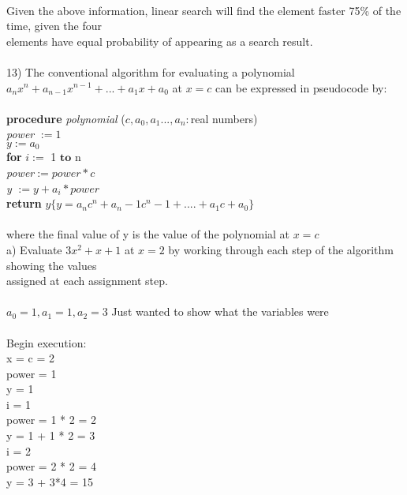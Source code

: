\documentclass{article}
\begin{document}
\begin{flushleft}
~\\
Given the above information, linear search will find the element faster 75\% of the time, given the four \\elements have equal probability of appearing as a search result.\\
~\\
\setlength\parindent{0pt}13) The conventional algorithm for evaluating a polynomial $a_nx^n + a_{n-1}x^{n-1} + ... + a_1x + a_0 $ at $ x = c$ can be expressed in pseudocode by: \\
~\\
\textbf{procedure} \textit{polynomial} ($c, a_0, a_1 . . . , a_n: $real numbers) \\
\setlength\parindent{24pt} \textit{power} $:= 1$ \\
\setlength\parindent{24pt} $y := a_0$ \\
\setlength\parindent{24pt}\textbf{for} $i := $ 1 $\textbf{to} $ n  \\
\setlength\parindent{48pt} \textit{power}$ := power * c$ \\
\setlength\parindent{48pt} \textit{y} $ := y + a_i * power$ \\
\setlength\parindent{24pt}\textbf{return} $ y \{ y = a_nc^n + a_n-1c^n-1 + .... + a_1c + a_0 \}$ \\
~\\
\setlength\parindent{24pt} where the final value of y is the value of the polynomial at $x = c$ \\
\setlength\parindent{24pt}a) Evaluate $3x^2 + x + 1 $ at $x = 2 $ by working through each step of the algorithm showing the values \\assigned at each assignment step. \\
~\\
$a_0 = 1, a_1 = 1, a_2 = 3$ {\tiny{Just wanted to show what the variables were }}\\ 
~\\
Begin execution: \\
x = c = 2 \\
power = 1 \\
y = 1 \\
i = 1 \\
power = 1 * 2 = 2 \\
y = 1 + 1 * 2 = 3 \\
i = 2 \\
power = 2 * 2 = 4 \\ 
y = 3 + 3*4 = 15 \\
~\\

\end{flushleft}
\end{document}
